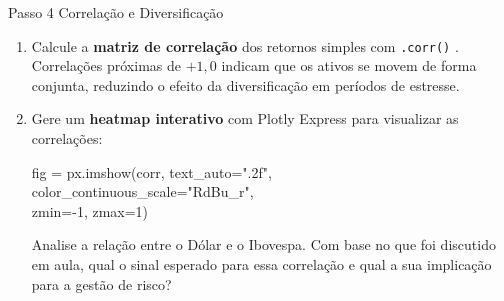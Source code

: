 \documentclass[11pt,a4paper]{article}
\newcommand{\code}[1]{%
  \colorbox{quantlightgray}{\texttt{\small\color{quantdark}#1}}%
}
\begin{document}
\newpage

\begin{stepbox}{Passo 4 \quad Correlação e Diversificação}
\begin{enumerate}
  \item Calcule a \textbf{matriz de correlação} dos retornos simples com \code{.corr()}.
        Correlações próximas de $+1{,}0$ indicam que os ativos se movem de forma conjunta,
        reduzindo o efeito da diversificação em períodos de estresse.

  \item Gere um \textbf{heatmap interativo} com Plotly Express para visualizar as correlações:

        \begin{highlightbox}
          \small\ttfamily
          fig = px.imshow(corr, text\_auto=".2f",\\
          \hspace{4.4em} color\_continuous\_scale="RdBu\_r",\\
          \hspace{4.4em} zmin=-1, zmax=1)
        \end{highlightbox}

        Analise a relação entre o Dólar e o Ibovespa. Com base no que foi discutido em aula,
        qual o sinal esperado para essa correlação e qual a sua implicação para a gestão de risco?
\end{enumerate}
\end{stepbox}

\vspace{1em}
\end{document}
